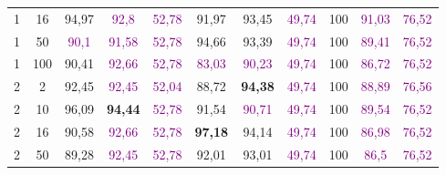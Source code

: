 \begin{table}[ht]
\begin{tabular}{cc|ccc|ccc|ccc}
        {1}                           & {16}    & {94,97}                             & \textcolor{purple}{92,8}            & \textcolor{purple}{52,78}                & {91,97}                         & {93,45}                         & \textcolor{purple}{49,74}      & {100}                           & \textcolor{purple}{91,03}       & \textcolor{purple}{76,52}      \\
        {1}                           & {50}    & \textcolor{purple}{90,1}            & \textcolor{purple}{91,58}           & \textcolor{purple}{52,78}                & {94,66}                         & {93,39}                         & \textcolor{purple}{49,74}      & {100}                           & \textcolor{purple}{89,41}       & \textcolor{purple}{76,52}      \\
        {1}                           & {100}   & {90,41}                             & \textcolor{purple}{92,66}           & \textcolor{purple}{52,78}                & \textcolor{purple}{83,03}       & \textcolor{purple}{90,23}       & \textcolor{purple}{49,74}      & {100}                           & \textcolor{purple}{86,72}       & \textcolor{purple}{76,52}      \\
        {2}                           & {2}     & {92,45}                             & \textcolor{purple}{92,45}           & \textcolor{purple}{52,04}                & {88,72}                         & \textbf{94,38}                  & \textcolor{purple}{49,74}      & {100}                           & \textcolor{purple}{88,89}       & \textcolor{purple}{76,56}      \\
        {2}                           & {10}    & {96,09}                             & \textbf{94,44}                      & \textcolor{purple}{52,78}                & {91,54}                         & \textcolor{purple}{90,71}       & \textcolor{purple}{49,74}      & {100}                           & \textcolor{purple}{89,54}       & \textcolor{purple}{76,52}      \\
        {2}                           & {16}    & {90,58}                             & \textcolor{purple}{92,66}           & \textcolor{purple}{52,78}                & \textbf{97,18}                  & {94,14}                         & \textcolor{purple}{49,74}      & {100}                           & \textcolor{purple}{86,98}       & \textcolor{purple}{76,52}      \\
        {2}                           & {50}    & {89,28}                             & \textcolor{purple}{92,45}           & \textcolor{purple}{52,78}                & {92,01}                         & {93,01}                         & \textcolor{purple}{49,74}      & {100}                           & \textcolor{purple}{86,5}        & \textcolor{purple}{76,52}      \\

\end{tabular}
\end{table}
